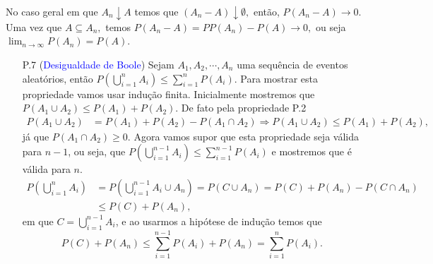 \begin{frame}
\begin{nota}
No caso geral em que $ A_n \downarrow A $ temos que $(A_n - A) \downarrow \emptyset,$ então, $ P(A_n - A)\rightarrow 0.$  Uma vez que $A \subseteq A_n,$ temos  $P(A_n - A)=P P(A_n) - P(A)\rightarrow 0,$ ou seja $ \lim_{n \rightarrow \infty}P(A_n)=P(A).$
 \end{nota}
\vspace{0.4cm}

\begin{enumerate}
 \item[P.7]   (\textcolor{blue}{Desigualdade de Boole}) Sejam $ A_1, A_2, \cdots , A_n $ uma sequência de eventos aleatórios, então $ P\left(\bigcup_{i=1}^{n}A_i\right)\leq \sum_{i=1}^{n} P(A_i).$ Para mostrar esta propriedade vamos usar indução finita. Inicialmente mostremos que $ P(A_1\cup A_2)\leq P(A_1)+P(A_2).$ De fato pela propriedade P.2 
$$
\begin{aligned}
P(A_1\cup A_2)&=P(A_1)+P(A_2)-P(A_1\cap A_2)  \Rightarrow P(A_1\cup A_2)\leq P(A_1)+P(A_2),
\end{aligned}
$$ 
já que $ P(A_1 \cap A_2)\geq 0 $.  Agora vamos supor que esta propriedade seja válida para $n-1$, ou seja, que $ P\left(\displaystyle \bigcup_{i=1}^{n-1}A_i\right)\leq \displaystyle\sum_{i=1}^{n-1} P(A_i) $ e mostremos que é válida para $n.$ $$
\begin{aligned}
P\left(\bigcup_{i=1}^{n}A_i\right)& =P\left(\bigcup_{i=1}^{n-1}A_i \cup A_n\right) =P(C \cup A_n)=P(C)+P(A_n)-P(C\cap A_n) \\ & \leq P(C)+P(A_n),
\end{aligned}
$$ em que $ C= \bigcup_{i=1}^{n-1}A_i $, e ao usarmos a hipótese de indução temos que 
$$ P(C)+P(A_n)\leq \sum_{i=1}^{n-1} P(A_i) + P(A_n)= \sum_{i=1}^{n} P(A_i).$$ 
\end{enumerate}

\end{frame}

